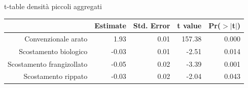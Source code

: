 \begin{frame}{t-table  densit\`a piccoli aggregati}
  \footnotesize
  \begin{table}[ht]
    \centering
    \begin{tabular}{rrrrr}
      \hline
      & Estimate & Std. Error & t value & Pr($>$$|$t$|$) \\ 
      \hline
      Convenzionale arato & 1.93 & 0.01 & 157.38 & 0.000 \\ 
      Scostamento biologico & -0.03 & 0.01 & -2.51 & 0.014 \\ 
      Scostamento frangizollato & -0.05 & 0.02 & -3.39 & 0.001 \\ 
      Scostamento rippato & -0.03 & 0.02 & -2.04 & 0.043 \\ 
      \hline
    \end{tabular}
    \label{tab:Riassunto densita spinta}
  \end{table}
\end{frame}



